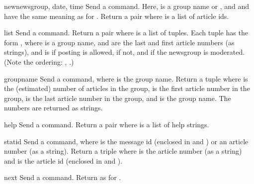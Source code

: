 \begin{funcdesc}{newnews}{group, date, time}
Send a  command.  Here,  is a group name or
, and  and  have the same meaning as for
.  Return a pair  where  is a list of article ids.
\end{funcdesc}

\begin{funcdesc}{list}{}
Send a  command.  Return a pair  where  is a list of tuples.  Each tuple has the
form , where
 is a group name,  and  are the last
and first article numbers (as strings), and  is 
if posting is allowed,  if not, and  if the
newsgroup is moderated.  (Note the ordering: , .)
\end{funcdesc}

\begin{funcdesc}{group}{name}
Send a  command, where  is the group name.
Return a tuple  where  is the (estimated) number
of articles in the group,  is the first article number in
the group,  is the last article number in the group, and
 is the group name.  The numbers are returned as strings.
\end{funcdesc}

\begin{funcdesc}{help}{}
Send a  command.  Return a pair  where  is a list of help strings.
\end{funcdesc}

\begin{funcdesc}{stat}{id}
Send a  command, where  is the message id (enclosed
in \samp{<} and \samp{>}) or an article number (as a string).
Return a triple  where
 is the article number (as a string) and  is the
article id  (enclosed in \samp{<} and \samp{>}).
\end{funcdesc}

\begin{funcdesc}{next}{}
Send a  command.  Return as for .
\end{funcdesc}

